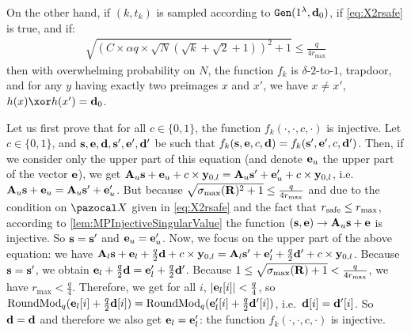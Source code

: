 {\begin{lemmaE}
    On the other hand, if $(k, t_k)$ is sampled according to ${\tt Gen}(1^\lambda, \mathbf{d}_0)$, if \cref{eq:X2rsafe} is true, and if:
    \begin{align}
      \sqrt{\left(C \times \alpha q \times \sqrt{N}(\sqrt{k}+\sqrt{2}+1)\right)^2 + 1} \leq \frac{q}{4 r_{\max}}\label{eq:linkWithRmax2}
    \end{align}
    then with overwhelming probability on $N$, the function $f_k$ is $\delta$-$2$-to-$1$, trapdoor, and for any $y$ having exactly two preimages $x$ and $x'$, we have $x \neq x'$, $h(x) \xor h(x') = \vect{d}_0$.
  \end{lemmaE}
  \begin{proofE}
    Let us first prove that for all $c \in \{0,1\}$, the function $f_k(\cdot,\cdot,c,\cdot)$ is injective. Let $c \in \{0,1\}$, and $\mathbf{s},\mathbf{e},\mathbf{d},\mathbf{s}',\mathbf{e}',\mathbf{d}'$ be such that $f_k(\mathbf{s},\mathbf{e},c,\mathbf{d}) = f_k(\mathbf{s}',\mathbf{e}',c,\mathbf{d}')$. Then, if we consider only the upper part of this equation (and denote $\mathbf{e}_u$ the upper part of the vector $\mathbf{e}$), we get $\mathbf{A}_u \mathbf{s} + \mathbf{e}_u + c \times \mathbf{y}_{0,l} = \mathbf{A}_u \mathbf{s}' + \mathbf{e}'_u + c \times \mathbf{y}_{0,l}$, i.e.\ $\mathbf{A}_u \mathbf{s} + \mathbf{e}_u = \mathbf{A}_u \mathbf{s}' + \mathbf{e}'_u$. But because $\sqrt{\sigma_{\max}(\mathbf{R})^2 +1} \leq \frac{q}{4 r_{\max}}$ and due to the condition on $\ccX$ given in \cref{eq:X2rsafe} and the fact that $r_{\text{safe}} \leq r_{\max}$, according to \cref{lem:MPInjectiveSingularValue} the function $(\mathbf{s},\mathbf{e}) \rightarrow \mathbf{A}_u \mathbf{s} + \mathbf{e}$ is injective. So $\mathbf{s} = \mathbf{s}'$ and $\mathbf{e}_u = \mathbf{e}'_u$. Now, we focus on the upper part of the above equation: we have $\mathbf{A}_l \mathbf{s} + \mathbf{e}_l + \frac{q}{2} \mathbf{\mathbf{d}}+ c \times \mathbf{y}_{0,l} = \mathbf{A}_l \mathbf{s'} + \mathbf{e}'_l + \frac{q}{2} \mathbf{\mathbf{d}'}+ c \times \mathbf{y}_{0,l}$. Because $\mathbf{s}=\mathbf{s}'$, we obtain $\mathbf{e}_l + \frac{q}{2} \mathbf{\mathbf{d}} = \mathbf{e}'_l + \frac{q}{2} \mathbf{\mathbf{d}'}$. Because $1 \leq \sqrt{\sigma_{\max}(\mathbf{R})+1} < \frac{q}{4 r_{\max}}$, we have $r_{\max} < \frac{q}{4}$. Therefore, we get for all $i$, $|\mathbf{e}_l[i]| < \frac{q}{4}$, so $\operatorname{RoundMod}_q(\mathbf{e}_l[i] + \frac{q}{2} \mathbf{d}[i]) = \operatorname{RoundMod}_q(\mathbf{e}_l'[i] + \frac{q}{2} \mathbf{d}'[i])$, i.e.\ $\mathbf{d}[i] = \mathbf{d}'[i]$. So $\mathbf{d} = \mathbf{d}$ and therefore we also get $\mathbf{e}_l=\mathbf{e}'_l$: the function $f_k(\cdot, \cdot, c, \cdot)$ is injective.


\end{proofE}}

